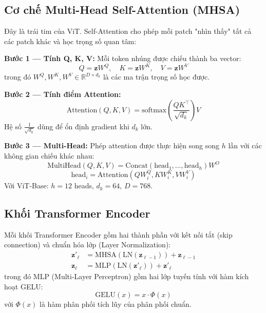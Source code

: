 \subsection{Cơ chế Multi-Head Self-Attention (MHSA)}
Đây là trái tim của ViT. Self-Attention cho phép mỗi patch "nhìn thấy" tất cả các patch khác và học trọng số quan tâm:

\textbf{Bước 1 --- Tính Q, K, V:} Mỗi token nhúng được chiếu thành ba vector:
\begin{equation}
    Q = \mathbf{z}W^Q, \quad K = \mathbf{z}W^K, \quad V = \mathbf{z}W^V
\end{equation}
trong đó $W^Q, W^K, W^V \in \mathbb{R}^{D \times d_k}$ là các ma trận trọng số học được.

\textbf{Bước 2 --- Tính điểm Attention:}
\begin{equation}
    \text{Attention}(Q, K, V) = \text{softmax}\!\left(\frac{QK^\top}{\sqrt{d_k}}\right)\!V
    \label{eq:attention}
\end{equation}
Hệ số $\frac{1}{\sqrt{d_k}}$ dùng để ổn định gradient khi $d_k$ lớn.

\textbf{Bước 3 --- Multi-Head:} Phép attention được thực hiện song song $h$ lần với các không gian chiếu khác nhau:
\begin{equation}
    \text{MultiHead}(Q,K,V) = \text{Concat}(\text{head}_1, \ldots, \text{head}_h)W^O
    \label{eq:multihead}
\end{equation}
\begin{equation}
    \text{head}_i = \text{Attention}(QW_i^Q, KW_i^K, VW_i^V)
\end{equation}
Với ViT-Base: $h = 12$ heads, $d_k = 64$, $D = 768$.

\subsection{Khối Transformer Encoder}
Mỗi khối Transformer Encoder gồm hai thành phần với kết nối tắt (skip connection) và chuẩn hóa lớp (Layer Normalization):
\begin{align}
    \mathbf{z}'_\ell &= \text{MHSA}(\text{LN}(\mathbf{z}_{\ell-1})) + \mathbf{z}_{\ell-1} \\
    \mathbf{z}_\ell  &= \text{MLP}(\text{LN}(\mathbf{z}'_\ell)) + \mathbf{z}'_\ell
\end{align}
trong đó MLP (Multi-Layer Perceptron) gồm hai lớp tuyến tính với hàm kích hoạt GELU:
\begin{equation}
    \text{GELU}(x) = x \cdot \Phi(x)
\end{equation}
với $\Phi(x)$ là hàm phân phối tích lũy của phân phối chuẩn.

